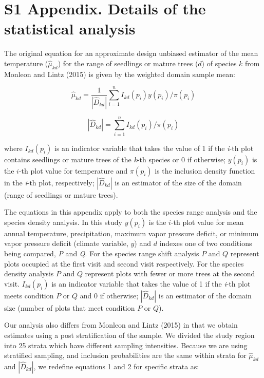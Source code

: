 \documentclass[12pt]{article}
\begin{document}
\pagestyle{plain}

\section*{S1 Appendix.  Details of the statistical analysis}

The original equation for an approximate design unbiased estimator of the mean temperature ($\hat{\mu}_{kd}$) for the range of seedlings or mature trees ($d$) of species $k$ from Monleon and Lintz (2015) is given by the weighted domain sample mean:

\begin{equation}
\hat{\mu}_{kd} = \frac{1}{|\hat{D}_{kd}|}\displaystyle\sum_{i=1}^{n} I_{kd}(p_i)y(p_i)/\pi(p_i)  
\end{equation} 

\begin{equation}
|\hat{D}_{kd}| = \displaystyle\sum_{i=1}^{n} I_{kd}(p_i)/\pi(p_i)  
\end{equation} 

where $I_{kd}(p_i)$ is an indicator variable that takes the value of 1 if the \emph{i}-th plot contains seedlings or mature trees of the \emph{k}-th species or 0 if otherwise; $y(p_i)$ is the $i$-th plot value for temperature and $\pi(p_i)$ is the inclusion density function in the \emph{i}-th plot, respectively; $|\hat{D}_{kd}|$ is an estimator of the size of the domain (range of seedlings or mature trees).

The equations in this appendix apply to both the species range analysis and the species density analysis.  In this study $y(p_i)$ is the $i$-th plot value for mean annual temperature, precipitation, maximum vapor pressure deficit, or minimum vapor pressure deficit (climate variable, $y$) and $d$ indexes one of two conditions being compared, \emph{P} and \emph{Q}.  For the species range shift analysis $P$ and $Q$ represent plots occupied at the first visit and second visit respectively.  For the species density analysis $P$ and $Q$  represent plots with fewer or more trees at the second visit.  $I_{kd}(p_i)$ is an indicator variable that takes the value of 1 if the \emph{i}-th plot meets condition $P$ or $Q$ and 0 if otherwise; $|\hat{D}_{kd}|$ is an estimator of the domain size (number of plots that meet condition $P$ or $Q$).

Our analysis also differs from Monleon and Lintz (2015) in that we obtain estimates using a post stratification of the sample.  We divided the study region into 25 strata which have different sampling intensities.  Because we are using stratified sampling, and inclusion probabilities are the same within strata for $\hat{\mu}_{kd}$ and $|\hat{D}_{kd}|$, we redefine equations 1 and 2 for specific strata as: 
\end{document}
